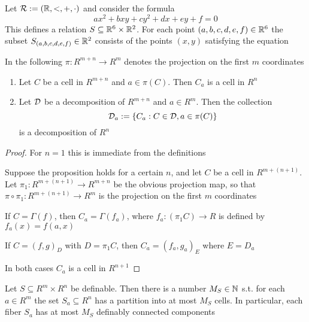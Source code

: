 \documentclass[11pt]{article}
\begin{document}
\begin{examplle}[]
Let \(\mathcal{R}:=(\mathbb{R},<,+,\cdot)\) and consider the formula
\begin{equation*}
ax^2+bxy+cy^2+dx+ey+f=0
\end{equation*}
This defines a relation \(S\subseteq\mathbb{R}^6\times\mathbb{R}^2\). For each point \((a,b,c,d,e,f)\in\mathbb{R}^6\) the
subset \(S_{(a,b,c,d,e,f)}\in\mathbb{R}^2\) consists of the points \((x,y)\) satisfying the equation
\end{examplle}

In the following \(\pi:R^{m+n}\to R^m\) denotes the projection on the first \(m\) coordinates

\begin{proposition}[]
\begin{enumerate}
\item Let \(C\) be a cell in \(R^{m+n}\) and \(a\in\pi(C)\). Then \(C_a\) is a cell in \(R^n\)
\item Let \(\mathcal{D}\) be a decomposition of \(R^{m+n}\) and \(a\in R^m\). Then the collection
\begin{equation*}
\mathcal{D}_a:=\{C_a:C\in\mathcal{D},a\in\pi(C)\}
\end{equation*}
is a decomposition of \(R^n\)
\end{enumerate}
\end{proposition}

\begin{proof}
For \(n=1\) this is immediate from the definitions

Suppose the proposition holds for a certain \(n\), and let \(C\) be a cell in \(R^{m+(n+1)}\).
Let \(\pi_1:R^{m+(n+1)}\to R^{m+n}\) be the obvious projection map, so that \(\pi\circ\pi_1:R^{m+(n+1)}\to R^m\)
is the projection on the first \(m\) coordinates

If \(C=\Gamma(f)\), then \(C_a=\Gamma(f_a)\), where \(f_a:(\pi_1C)\to R\) is defined by \(f_a(x)=f(a,x)\)

If \(C=(f,g)_D\) with \(D=\pi_1C\), then \(C_a=(f_a,g_a)_E\) where \(E=D_a\)

In both cases \(C_a\) is a cell in \(R^{n+1}\)
\end{proof}

\begin{corollary}[]
Let \(S\subseteq R^m\times R^n\) be definable. Then there is a number \(M_S\in\mathbb{N}\) s.t. for each \(a\in R^m\) the
set \(S_a\subseteq R^n\) has a partition into at most \(M_S\) cells. In particular, each fiber \(S_a\) has
at most \(M_S\) definably connected components
\end{corollary}
\end{document}
